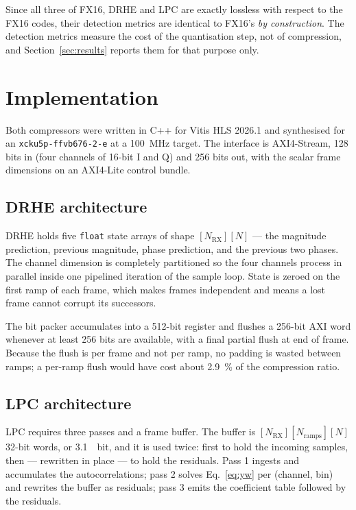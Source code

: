 \documentclass[10pt,twocolumn]{article}
\begin{document}
Since all three of FX16, DRHE and LPC are exactly lossless with respect to the
FX16 codes, their detection metrics are identical to FX16's \emph{by
construction}. The detection metrics measure the cost of the quantisation step,
not of compression, and Section~\ref{sec:results} reports them for that purpose
only.

\section{Implementation}
\label{sec:implementation}

Both compressors were written in C++ for Vitis HLS 2026.1 and synthesised for
an \texttt{xcku5p-ffvb676-2-e} at a \SI{100}{\mega\hertz} target. The interface
is AXI4-Stream, \num{128} bits in (four channels of 16-bit I and Q) and
\num{256} bits out, with the scalar frame dimensions on an AXI4-Lite control
bundle.

\subsection{DRHE architecture}

DRHE holds five \texttt{float} state arrays of shape
$[N_{\mathrm{RX}}][N]$ --- the magnitude prediction, previous magnitude, phase
prediction, and the previous two phases. The channel dimension is completely
partitioned so the four channels process in parallel inside one pipelined
iteration of the sample loop. State is zeroed on the first ramp of each frame,
which makes frames independent and means a lost frame cannot corrupt its
successors.

The bit packer accumulates into a 512-bit register and flushes a 256-bit AXI
word whenever at least 256 bits are available, with a final partial flush at
end of frame. Because the flush is per frame and not per ramp, no padding is
wasted between ramps; a per-ramp flush would have cost about
\SI{2.9}{\percent} of the compression ratio.

\subsection{LPC architecture}

LPC requires three passes and a frame buffer. The buffer is
$[N_{\mathrm{RX}}][N_{\mathrm{ramps}}][N]$ 32-bit words, or
\SI{3.1}{\mebi bit}, and it is used twice: first to hold the incoming samples,
then --- rewritten in place --- to hold the residuals. Pass 1 ingests and
accumulates the autocorrelations; pass 2 solves Eq.~\eqref{eq:yw} per (channel,
bin) and rewrites the buffer as residuals; pass 3 emits the coefficient table
followed by the residuals.
\end{document}
